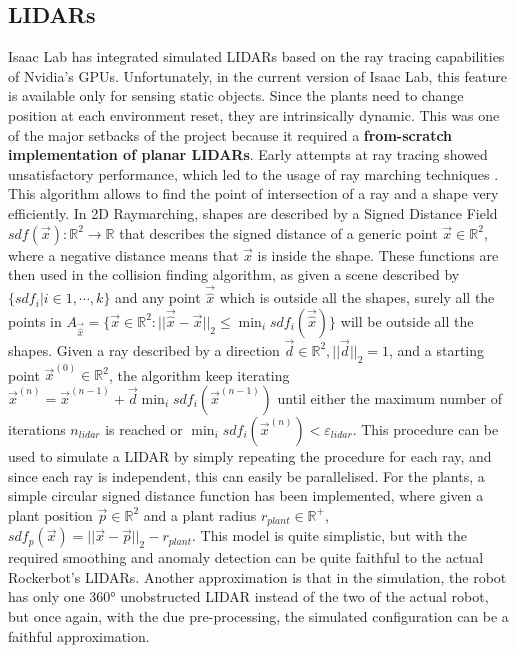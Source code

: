\documentclass[11pt,a4paper,twocolumn]{article}
\begin{document}
\subsection{LIDARs}
Isaac Lab has integrated simulated LIDARs based on the ray tracing capabilities of Nvidia's GPUs. Unfortunately, in the current version 
of Isaac Lab, this feature is available only for sensing static objects. Since the plants need to change position at each environment reset, they are intrinsically dynamic. This was one of the major setbacks of the project because it required a \textbf{from-scratch implementation of planar LIDARs}. Early attempts at ray tracing showed unsatisfactory performance, which led to the usage of ray marching techniques \cite{Raymarching}. This algorithm allows to find the point of intersection of a ray and a shape very efficiently.  In 2D Raymarching, shapes are described by a Signed Distance Field $sdf(\vec{x}):\mathbb{R}^2\to\mathbb{R}$ that describes the signed distance of a generic point $\vec{x} \in \mathbb{R}^2$, where a negative distance means that $\vec{x}$ is inside the shape. These functions are then used in the collision finding algorithm, as given a scene described by $\{sdf_i|i\in{1, \cdots, k}\}$ and any point $\vec{\hat{x}}$ which is outside all the shapes, surely all the points in $A_{\vec{\hat{x}}} = \{\vec{x}\in\mathbb{R}^2: ||\vec{\hat{x}}-\vec{x}||_2 \leq \min_{i}sdf_i(\vec{\hat{x}}) \}$ will be outside all the shapes. Given a ray described by a direction $\vec{d}\in\mathbb{R}^2, ||\vec{d}||_2 = 1$, and a starting point $\vec{x}^{(0)} \in \mathbb{R}^2$, the algorithm keep iterating $\vec{x}^{(n)} = \vec{x}^{(n-1)} + \vec{d} \min_{i}sdf_i(\vec{x}^{(n-1)})$ until either the maximum number of iterations $n_{lidar}$ is reached or $\min_{i}sdf_i(\vec{x}^{(n)})<\varepsilon_{lidar}$. This procedure can be used to simulate a LIDAR by simply repeating the procedure for each ray, and since each ray is independent, this can easily be parallelised. For the plants, a simple circular signed distance function has been implemented, where given a plant position $\vec{p} \in \mathbb{R}^2$ and a plant radius $r_{plant} \in \mathbb{R}^+$, $sdf_p(\vec{x})=||\vec{x} - \vec{p} ||_2 - r_{plant}$. This model is quite simplistic, but with the required smoothing and anomaly detection can be quite faithful to the actual Rockerbot's LIDARs. Another approximation is that in the simulation, the robot has only one 360° unobstructed LIDAR instead of the two of the actual robot, but once again, with the due pre-processing, the simulated configuration can be a faithful approximation.
\end{document}
